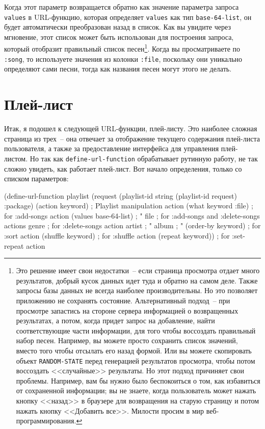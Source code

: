 Когда этот параметр возвращается обратно как значение параметра запроса \lstinline{values}
в URL-функцию, которая определяет \lstinline{values} как тип \lstinline{base-64-list}, он
будет автоматически преобразован назад в список. Как вы увидите через мгновение, этот
список может быть использован для построения запроса, который отобразит правильный список
песен\footnote{Это решение имеет свои недостатки~-- если страница просмотра отдает много
  результатов, добрый кусок данных идет туда и обратно на самом деле. Также запросы базы
  данных не всегда наиболее производительны. Но это позволяет приложению не сохранять
  состояние. Альтернативный подход~-- при просмотре запастись на стороне сервера
  информацией о возвращенных результатах, а потом, когда придет запрос на добавление,
  найти соответствующие части информации, для того чтобы воссоздать правильный набор
  песен. Например, вы можете просто сохранить список значений, вместо того чтобы отсылать
  его назад формой. Или вы можете скопировать объект \lstinline{RANDOM-STATE} перед
  генерацией результатов просмотра, чтобы потом воссоздать <<случайные>> результаты. Но
  этот подход причиняет свои проблемы. Например, вам бы нужно было беспокоиться о том, как
  избавиться от сохраненной информации; вы не знаете, когда пользователь может нажать
  кнопку <<назад>> в браузере для возвращения на старую страницу и потом нажать кнопку
  <<Добавить все>>. Милости просим в мир веб-программирования.}. Когда вы просматриваете
по \lstinline{:song}, то используете значения из колонки \lstinline{:file}, поскольку они
уникально определяют сами песни, тогда как названия песен могут этого не делать.

\section{Плей-лист}

Итак, я подошел к следующей URL-функции, плей-листу. Это наиболее сложная страница из
трех~-- она отвечает за отображение текущего содержания плей-листа пользователя, а также за
предоставление интерфейса для управления плей-листом. Но так как \lstinline{define-url-function}
обрабатывает рутинную работу, не так сложно увидеть, как работает плей-лист. Вот начало
определения, только со списком параметров: 

\begin{myverb}
(define-url-function playlist 
    (request
     (playlist-id string (playlist-id request) :package)
     (action keyword)      ; Playlist manipulation action
     (what keyword :file)  ; for :add-songs action
     (values base-64-list) ;             "
     file                  ; for :add-songs and :delete-songs actions
     genre                 ; for :delete-songs action
     artist                ;             "
     album                 ;             "
     (order-by keyword)    ; for :sort action
     (shuffle keyword)     ; for :shuffle action
     (repeat keyword))     ; for :set-repeat action
\end{myverb}

